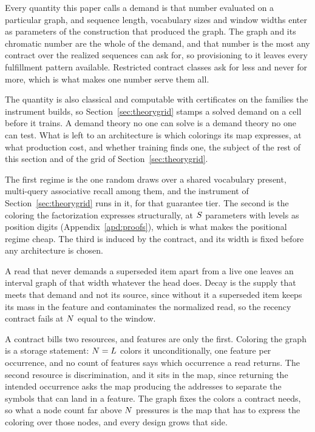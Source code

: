 Every quantity this paper calls a demand is that number evaluated on a particular graph, and sequence length, vocabulary sizes and window widths enter as parameters of the construction that produced the graph. The graph and its chromatic number are the whole of the demand, and that number is the most any contract over the realized sequences can ask for, so provisioning to it leaves every fulfillment pattern available. Restricted contract classes ask for less and never for more, which is what makes one number serve them all.

The quantity is also classical and computable with certificates on the families the instrument builds, so Section~\ref{sec:theorygrid} stamps a solved demand on a cell before it trains. A demand theory no one can solve is a demand theory no one can test. What is left to an architecture is which colorings its map expresses, at what production cost, and whether training finds one, the subject of the rest of this section and of the grid of Section~\ref{sec:theorygrid}.

The first regime is the one random draws over a shared vocabulary present, multi-query associative recall among them, and the instrument of Section~\ref{sec:theorygrid} runs in it, for that guarantee tier. The second is the coloring the factorization expresses structurally, at $S$ parameters with levels as position digits (Appendix~\ref{apd:proofs}), which is what makes the positional regime cheap. The third is induced by the contract, and its width is fixed before any architecture is chosen.

A read that never demands a superseded item apart from a live one leaves an interval graph of that width whatever the head does. Decay is the supply that meets that demand and not its source, since without it a superseded item keeps its mass in the feature and contaminates the normalized read, so the recency contract fails at $N$ equal to the window.

A contract bills two resources, and features are only the first. Coloring the graph is a storage statement: $N = L$ colors it unconditionally, one feature per occurrence, and no count of features says which occurrence a read returns. The second resource is discrimination, and it sits in the map, since returning the intended occurrence asks the map producing the addresses to separate the symbols that can land in a feature. The graph fixes the colors a contract needs, so what a node count far above $N$ pressures is the map that has to express the coloring over those nodes, and every design grows that side.

